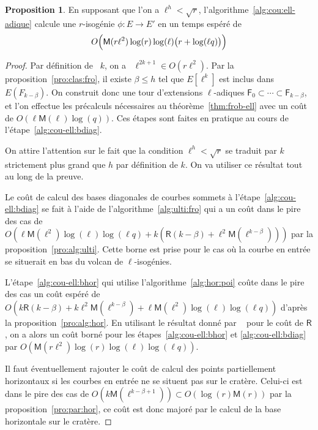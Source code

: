 \documentclass[10pt,a4paper]{book}
\theoremstyle{plain}
\theoremstyle{definition}
\theoremstyle{definition}
\theoremstyle{definition}
\newtheorem{prop}[thm]{Proposition}
\theoremstyle{definition}
\theoremstyle{remark}
\theoremstyle{remark}
\theoremstyle{definition}
\begin{document}
\begin{prop}
  \label{pro:full-complexity}
  En supposant que l'on a $\ell^h<\sqrt{r}$, 
  l'algorithme~\ref{alg:cou:ell-adique} calcule une $r$-isogénie 
  ${\phi:E \rightarrow E'}$ en un temps espéré de 
 \[
O\Bigl( \mathsf{M}(r \ell^2) \log(r) \log(\ell) \bigl( r + \log(\ell q) \bigr) \Bigr) 
 \]
\end{prop}
\begin{proof}
Par définition de ~$k$, on a ~$\ell^{2k+1} \in O(r\ell^2)$.
  Par la proposition~\ref{pro:clas:fro}, il existe $\beta \leqslant h$ tel que
  $E[\ell^k]$ est inclus dans $E(F_{k-\beta})$. On construit donc une
  tour d'extensions $\ell$-adiques $\mathsf{F}_0\subset\cdots\subset 
  \mathsf{F}_{k-\beta}$, et l'on effectue les précalculs nécessaires au 
  théorème~\ref{thm:frob-ell} avec un coût de 
  $O(\ell\mathsf{M}(\ell)\log(q))$. Ces étapes sont faites en pratique au cours
  de l'étape~\ref{alg:cou-ell:bdiag}.
  
  On attire l'attention sur le fait que la condition $\ell^h<\sqrt{r}$ se traduit par 
  $k$ strictement plus grand que $h$ par définition de $k$.
  On va utiliser ce résultat tout au long de la preuve. 
 
  Le coût de calcul des bases diagonales de courbes sommets à 
  l'étape~\ref{alg:cou-ell:bdiag} se fait à l'aide de 
  l'algorithme~\ref{alg:ulti:fro} qui a un coût dans le pire des cas
  de $O(\ell\mathsf{M}(\ell^2)\log(\ell)\log(\ell q)+k(\mathsf{R}(k-\beta) +  \ell^2\mathsf{M}(\ell^{k-\beta})))$ 
  par la proposition~\ref{pro:alg:ulti}. Cette borne est prise pour le cas où 
  la courbe en entrée se situerait en bas du volcan de $\ell$-isogénies. 

  L'étape~\ref{alg:cou-ell:bhor} qui utilise 
  l'algorithme~\ref{alg:hor:poi} coûte dans le pire des cas un coût espéré de
  $O(k\mathsf{R}(k-\beta) + k\ell^2\mathsf{M}(\ell^{k-\beta}) + \ell\mathsf{M}(\ell^2)\log(\ell)\log(\ell q))$ d'après la 
  proposition~\ref{pro:alg:hor}.
  En utilisant le  résultat  donné par ~\cite[Chapter~14.5]{vzGJG03} pour le 
  coût de $\mathsf{R}$, on a alors un coût borné pour les 
  étapes~\ref{alg:cou-ell:bhor} et \ref{alg:cou-ell:bdiag} par 
  $O(\mathsf{M}(r\ell^2)\log(r)\log(\ell)\log(\ell q))$.
  
  Il faut éventuellement rajouter le coût de calcul des points partiellement 
  horizontaux si les courbes en entrée ne se situent pas sur le cratère. 
  Celui-ci est dans le pire des cas de
  $O(k\mathsf{M}(\ell^{k-\beta+1})) \subset O(\log(r) \mathsf{M}(r) )$ par la proposition~\ref{pro:par:hor}, ce 
  coût est donc majoré par le calcul de la base horizontale sur le cratère.


\end{proof}
\end{document}
